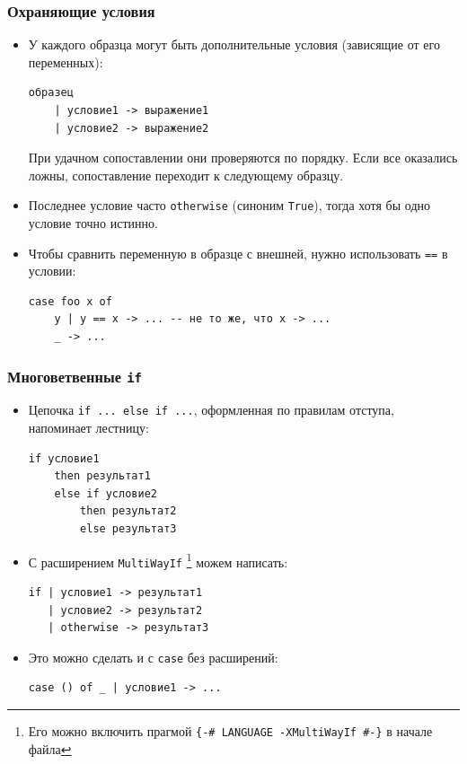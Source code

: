 \documentclass[10pt]{beamer}
\begin{document}
\begin{frame}[fragile]
\frametitle{Охраняющие условия}
\begin{itemize}
    \item У каждого образца могут быть дополнительные условия (зависящие от его переменных): 
\begin{lstlisting}[basicstyle=\ttfamily]
образец
    | условие1 -> выражение1 
    | условие2 -> выражение2
\end{lstlisting}
При удачном сопоставлении они проверяются по порядку. Если все оказались ложны, сопоставление переходит к следующему образцу.
\item Последнее условие часто \lstinline|otherwise| (синоним \lstinline|True|), тогда хотя бы одно условие точно истинно.
\item Чтобы сравнить переменную в образце с внешней, нужно использовать \lstinline|==| в условии:
\begin{lstlisting}[basicstyle=\ttfamily]
case foo x of
    y | y == x -> ... -- не то же, что x -> ...
    _ -> ...
\end{lstlisting}
\end{itemize}
\end{frame}

\begin{frame}[fragile]
\frametitle{Многоветвенные \lstinline[basicstyle=\ttfamily]|if|}
\begin{itemize}
    \item Цепочка \lstinline|if ... else if ...|, оформленная по правилам отступа, напоминает лестницу:
\begin{lstlisting}[basicstyle=\ttfamily\small]
if условие1
    then результат1
    else if условие2
        then результат2
        else результат3
\end{lstlisting}
    \item С расширением \lstinline|MultiWayIf| \cprotect\footnote{Его можно включить прагмой \lstinline|{-# LANGUAGE -XMultiWayIf #-}| в начале файла} можем написать:
\begin{lstlisting}[basicstyle=\ttfamily\small]
if | условие1 -> результат1
   | условие2 -> результат2
   | otherwise -> результат3
\end{lstlisting}
\item Это можно сделать и с \lstinline|case| без расширений:  \pause \begin{lstlisting}[basicstyle=\ttfamily\small]
case () of _ | условие1 -> ...
\end{lstlisting}
\end{itemize}
\end{frame}
\end{document}
